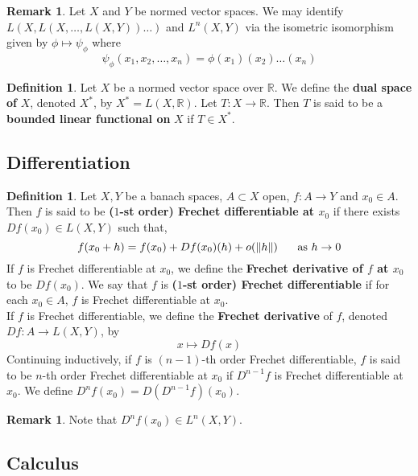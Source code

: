 \documentclass[twoside]{article}
\theoremstyle{definition}
\newtheorem{defn}[definition]{Definition}
\theoremstyle{definition}
\newtheorem{rem}[definition]{Remark}
\newcommand{\R}{\mathbb{R}}
\begin{document}
	\begin{rem}
	
	Let $X$ and $Y$ be normed vector spaces. We may identify $L(X, L(X, \dots, L(X, Y)) \dots)$ and $L^n(X, Y)$ via the isometric isomorphism given by $\phi \mapsto \psi_{\phi}$ where $$\psi_{\phi}(x_1, x_2, \dots, x_n) = \phi(x_1)(x_2) \dots (x_n)$$ 
	\end{rem}
	
	\begin{defn}
	Let $X$ be a normed vector space over $\R$. We define the \textbf{dual space of} $X$, denoted $X^*$, by $X^* = L(X, \R)$. Let $T: X \rightarrow \R$. Then $T$ is said to be a \textbf{bounded linear functional on} $X$ if $T \in X^*$.
	\end{defn}
	
	\subsection{Differentiation}
	
	\begin{defn}
	Let $X, Y$ be a banach spaces, $A \subset X$ open, $f:A \rightarrow Y$ and $x_0 \in A$. Then $f$ is said to be \textbf{\textbf{($1$-st order) Frechet differentiable} at $x_0$} if there exists $Df(x_0) \in L(X,Y)$ such that, $$f(x_0 + h) = f(x_0) + Df(x_0)(h) + o(\|h\| ) \hspace{.5cm} \text{ as } h \rightarrow 0$$  
	If $f$ is Frechet differentiable at $x_0$, we define the \textbf{Frechet derivative of $f$ at $x_0$} to be $Df(x_0)$.
	We say that $f$ is \textbf{($1$-st order) Frechet differentiable} if for each $x_0 \in A$, $f$ is Frechet differentiable at $x_0$. \\
	If $f$ is Frechet differentiable, we define the \textbf{Frechet derivative} of $f$, denoted $Df: A \rightarrow L(X,Y)$, by $$x \mapsto Df(x)$$
	Continuing inductively, if $f$ is $(n-1)$-th order Frechet differentiable, $f$ is said to be $n$-th order Frechet differentiable at $x_0$ if $D^{n-1}f$ is Frechet differentiable at $x_0$. We define $D^nf(x_0) = D(D^{n-1}f)(x_0)$.
	\end{defn}
	
	\begin{rem}
Note that $D^nf(x_0) \in L^n(X,Y)$. 
\end{rem}

\subsection{Calculus}
\end{document}
